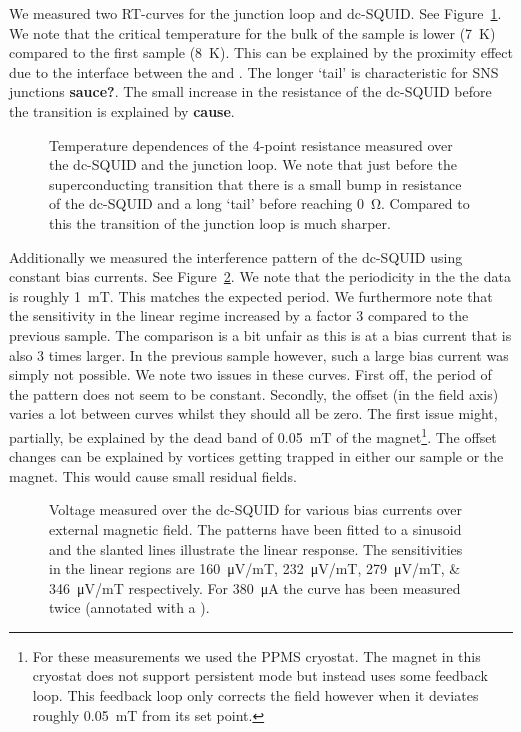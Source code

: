 We measured two RT-curves for the junction loop and dc-SQUID. See Figure~\ref{fig:CP2.6B_RT_curves}. We note that the critical temperature for the bulk of the sample is lower (\qty{7}{\kelvin}) compared to the first sample (\qty{8}{\kelvin}). This can be explained by the proximity effect due to the interface between the  and \cite{cirilloSuperconductingProximityEffect2005}. The longer `tail' is characteristic for SNS junctions \textbf{sauce?}. The small increase in the resistance of the dc-SQUID before the transition is explained by \textbf{cause}.

\begin{figure}[ht!]
	\centering
	
	\caption{Temperature dependences of the 4-point resistance measured over the dc-SQUID and the junction loop. We note that just before the superconducting transition that there is a small bump in resistance of the dc-SQUID and a long `tail' before reaching \qty{0}{\ohm}. Compared to this the transition of the junction loop is much sharper.}
	\label{fig:CP2.6B_RT_curves}
\end{figure}

Additionally we measured the interference pattern of the dc-SQUID using constant bias currents. See Figure~\ref{fig:CP2.6B_SQUID_calibration_curves}. We note that the periodicity in the the data is roughly \qty{1}{\milli\tesla}. This matches the expected period. We furthermore note that the sensitivity in the linear regime increased by a factor 3 compared to the previous sample. The comparison is a bit unfair as this is at a bias current that is also 3 times larger. In the previous sample however, such a large bias current was simply not possible. We note two issues in these curves. First off, the period of the pattern does not seem to be constant. Secondly, the offset (in the field axis) varies a lot between curves whilst they should all be zero. The first issue might, partially, be explained by the dead band of \qty{0.05}{\milli\tesla} of the magnet\footnote{For these measurements we used the PPMS cryostat. The magnet in this cryostat does not support persistent mode but instead uses some feedback loop. This feedback loop only corrects the field however when it deviates roughly \qty{0.05}{\milli\tesla} from its set point.}. The offset changes can be explained by vortices getting trapped in either our sample or the magnet. This would cause small residual fields.

\begin{figure}[ht!]
	\centering
	
	\caption{Voltage measured over the dc-SQUID for various bias currents over external magnetic field. The patterns have been fitted to a sinusoid and the slanted lines illustrate the linear response. The sensitivities in the linear regions are \qtylist{160;232;279;346}{\micro\volt/\milli\tesla} respectively. For \qty{380}{\micro\ampere} the curve has been measured twice (annotated with a \dag).}
	\label{fig:CP2.6B_SQUID_calibration_curves}
\end{figure}

